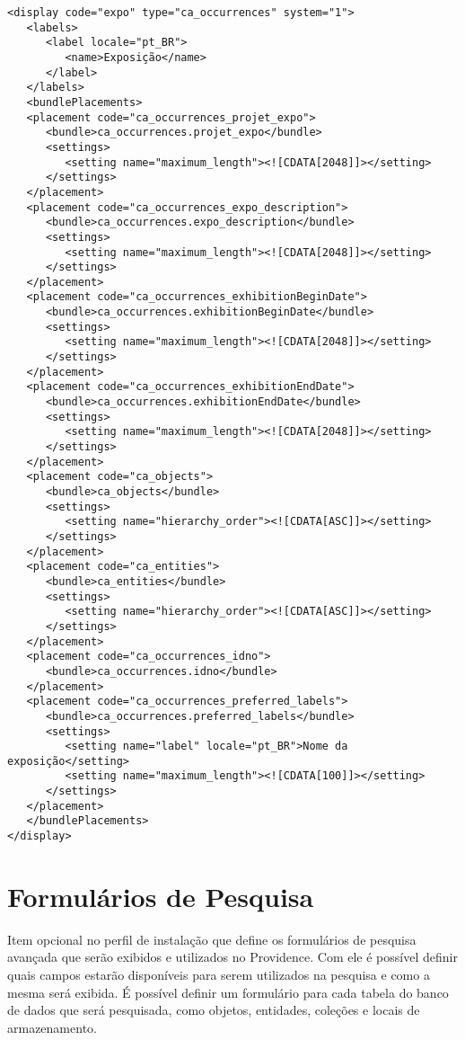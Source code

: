 \begin{lstlisting}
<display code="expo" type="ca_occurrences" system="1">
   <labels>
	  <label locale="pt_BR">
		 <name>Exposição</name>
	  </label>
   </labels>
   <bundlePlacements>
   <placement code="ca_occurrences_projet_expo">
      <bundle>ca_occurrences.projet_expo</bundle>
	  <settings>
		 <setting name="maximum_length"><![CDATA[2048]]></setting>
	  </settings>
   </placement>
   <placement code="ca_occurrences_expo_description">
	  <bundle>ca_occurrences.expo_description</bundle>
	  <settings>
		 <setting name="maximum_length"><![CDATA[2048]]></setting>
	  </settings>
   </placement>
   <placement code="ca_occurrences_exhibitionBeginDate">
	  <bundle>ca_occurrences.exhibitionBeginDate</bundle>
	  <settings>
		 <setting name="maximum_length"><![CDATA[2048]]></setting>
	  </settings>
   </placement>
   <placement code="ca_occurrences_exhibitionEndDate">
	  <bundle>ca_occurrences.exhibitionEndDate</bundle>
	  <settings>
	     <setting name="maximum_length"><![CDATA[2048]]></setting>
	  </settings>
   </placement>
   <placement code="ca_objects">
	  <bundle>ca_objects</bundle>
	  <settings>
		 <setting name="hierarchy_order"><![CDATA[ASC]]></setting>
	  </settings>
   </placement>
   <placement code="ca_entities">
	  <bundle>ca_entities</bundle>
	  <settings>
		 <setting name="hierarchy_order"><![CDATA[ASC]]></setting>
	  </settings>
   </placement>
   <placement code="ca_occurrences_idno">
	  <bundle>ca_occurrences.idno</bundle>
   </placement>
   <placement code="ca_occurrences_preferred_labels">
	  <bundle>ca_occurrences.preferred_labels</bundle>
	  <settings>
		 <setting name="label" locale="pt_BR">Nome da exposição</setting>
		 <setting name="maximum_length"><![CDATA[100]]></setting>
	  </settings>
   </placement>
   </bundlePlacements>
</display>
\end{lstlisting}

\section{Formulários de Pesquisa}

Item opcional no perfil de instalação que define os formulários de pesquisa avançada que serão exibidos e utilizados no Providence. Com ele é possível definir quais campos estarão disponíveis para serem utilizados na pesquisa e como a mesma será exibida. É possível definir um formulário para cada tabela do banco de dados que será pesquisada, como objetos, entidades, coleções e locais de armazenamento.

